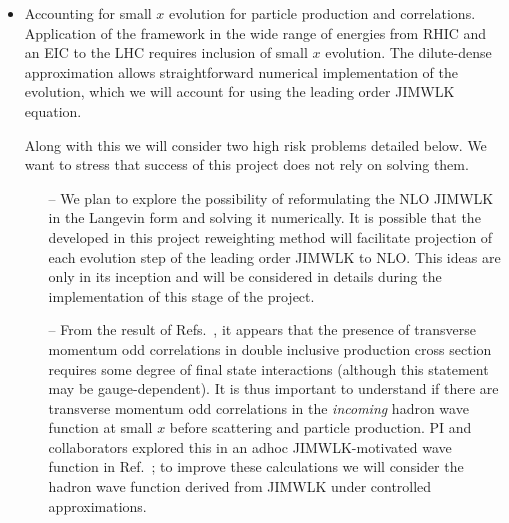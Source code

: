 \begin{itemize}
			\item Accounting for small $x$ evolution for particle production and correlations. 
				Application of the framework in the wide range of energies from RHIC and an EIC to the LHC  requires 
				inclusion of small $x$ evolution. The dilute-dense approximation allows straightforward 
				numerical implementation  of the evolution, which we will account for using the leading order 
				JIMWLK equation. 

				Along with this we will consider two high risk problems detailed below. 
				We want to stress that success of this project does not rely on solving them. %
				\begin{itemize}
					\item[--]
				We  plan to explore the possibility of reformulating the NLO JIMWLK in the Langevin form and 
				solving it numerically. It is possible that the developed in this project reweighting method 
				will facilitate projection of each evolution step of the leading order JIMWLK to NLO. This ideas are only 
				in its inception and will be considered in details during the implementation of this stage of the project.
					\item[--]
				From the result of Refs.~\cite{McLerran:2016snu,Kovchegov:2018jun}, it appears that 
				the presence of transverse momentum odd correlations in double inclusive production cross section 
				requires some degree of final state interactions (although 
				this statement may be gauge-dependent). It is thus important to understand if there
				are transverse momentum odd correlations in the {\it incoming} hadron wave function at small $x$
				before scattering and particle production. PI and collaborators  explored  this in an adhoc  JIMWLK-motivated 
				wave function in Ref.~\cite{Kovner:2016jfp}; to improve  these calculations  we will consider 
				the hadron wave function derived from JIMWLK under controlled approximations.  
				\end{itemize}
			

\end{itemize}
